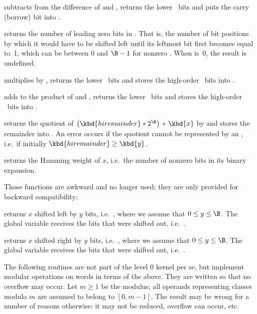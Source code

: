  subtracts  from the
difference of  and , returns the lower \B\ bits and puts the
carry (borrow) bit into .

 returns the number of leading zero bits in .
That is, the number of bit positions by which it would have to be shifted
left until its leftmost bit first becomes equal to~1, which can be between 0
and $\B-1$ for nonzero . When  is~0, the result is undefined.

 multiplies  by , returns
the lower \B\ bits and stores the high-order \B\ bits into .

 adds  to the product
of  and , returns the lower \B\ bits and stores the high-order
\B\ bits into .

 returns the quotient of
$  \left(\kbd{hiremainder} * 2^{\B}\right) + \kbd{x} $
by  and stores the remainder into . An error occurs
if the quotient cannot be represented by an , i.e.~if initially
$\kbd{hiremainder}\ge\kbd{y}$.

 returns the Hamming weight of $x$, i.e.~the
number of nonzero bits in its binary expansion.

 Those functions are awkward and no longer used;
they are only provided for backward compatibility:

 returns $x$ shifted left by $y$ bits,
i.e.~, where we assume that $0\leq y\leq\B$. The global variable
 receives the bits that were shifted out,
i.e.~.

 returns $x$ shifted right by $y$ bits,
i.e.~, where we assume that $0\leq y\leq\B$. The global variable
 receives the bits that were shifted out,
i.e.~.

The following routines are not part of the level 0 kernel per se, but
implement modular operations on words in terms of the above. They are written
so that no overflow may occur. Let $m \geq 1$ be the modulus; all operands
representing classes modulo $m$ are assumed to belong to $[0,m-1]$. The
result may be wrong for a number of reasons otherwise: it may not be reduced,
overflow can occur, etc.

